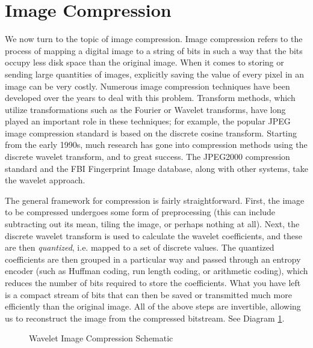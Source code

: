 \section*{Image Compression}
We now turn to the topic of image compression.
Image compression refers to the process of mapping a digital image to a
string of bits in such a way that the bits occupy less disk space than the
original image. When it comes to storing
or sending large quantities of images, explicitly saving
the value of every pixel in an image can be very costly.
Numerous image compression techniques
have been developed over the years to deal with this problem.
Transform methods, which utilize transformations such as the Fourier or Wavelet transforms,
have long played an important role in these
techniques; 
for example, the popular JPEG image compression standard is based on
the discrete cosine transform. Starting from the early 1990s, much
research has gone into compression methods using the discrete wavelet
transform, and to great success. The JPEG2000 compression standard
and the FBI Fingerprint Image database, along with other systems,
take the wavelet approach.

The general framework for compression is fairly straightforward. First,
the image to be compressed undergoes some form of preprocessing (this
can include subtracting out its mean, tiling the image, or perhaps
nothing at all). Next, the discrete wavelet transform is used to calculate
the wavelet coefficients, and these are then \textit{quantized},
i.e. mapped to a set of discrete values. The quantized coefficients are
then grouped in a particular way and passed through an entropy encoder
(such as Huffman coding, run length coding, or arithmetic coding), which reduces
the number of bits required to store the coefficients.
What you have left is a compact stream of bits
that can then be saved or transmitted much more efficiently than the
original image. All of the above steps are invertible, allowing us to
reconstruct the image from the compressed bitstream. See Diagram
\ref{tikz:wsqscheme}.

\begin{figure}
\centering
{}
\label{tikz:wsqscheme}
\caption{Wavelet Image Compression Schematic}
\end{figure}

